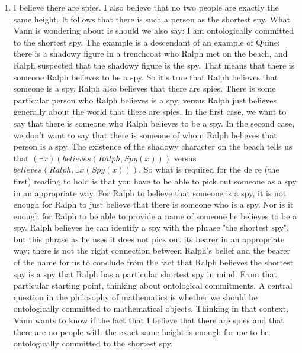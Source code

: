 \documentclass[12pt]{article}
\theoremstyle{definition}
\begin{document}
\begin{enumerate}
    \itemsep0em 
    \item
        I believe there are spies. I also believe that no two people are
        exactly the same height. It follows that there is such a person as the
        shortest spy. What Vann is wondering about is should we also say: I am
        ontologically committed to the shortest spy. The example is a
        descendant of an example of Quine: there is a shadowy figure in a
        trenchcoat who Ralph met on the beach, and Ralph suspected that the
        shadowy figure is the spy. That means that there is someone Ralph
        believes to be a spy. So it's true that Ralph believes that someone is
        a spy. Ralph also believes that there are spies. There is some
        particular person who Ralph believes is a spy, versus Ralph just
        believes generally about the world that there are spies. In the first
        case, we want to say that there is someone who Ralph believes to be a
        spy. In the second case, we don't want to say that there is someone of
        whom Ralph believes that person is a spy. The existence of the shadowy
        character on the beach tells us that $(\exists x)(believes(Ralph,
        Spy(x)))$ versus $believes(Ralph, \exists x (Spy (x)))$. So what is
        required for the de re (the first) reading to hold is that you have to
        be able to pick out someone as a spy in an appropriate way. For Ralph
        to believe that someone is a spy, it is not enough for Ralph to just
        believe that there is someone who is a spy. Nor is it enough for Ralph
        to be able to provide a name of someone he believes to be a spy. Ralph
        believes he can identify a spy with the phrase "the shortest spy", but
        this phrase as he uses it does not pick out its bearer in an
        appropriate way; there is not the right connection between Ralph's
        belief and the bearer of the name for us to conclude from the fact that
        Ralph believes the shortest spy is a spy that Ralph has a particular
        shortest spy in mind. From that particular starting point, thinking
        about ontological commitments. A central question in the philosophy of
        mathematics is whether we should be ontologically committed to
        mathematical objects. Thinking in that context, Vann wants to know if
        the fact that I believe that there are spies and that there are no
        people with the exact same height is enough for me to be ontologically
        committed to the shortest spy.

\end{enumerate}
\end{document}

